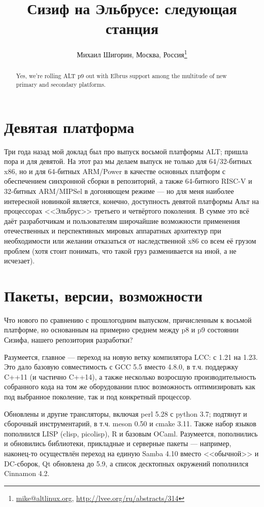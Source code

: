 \documentclass[10pt, a5paper]{article}
\begin{document}
\title{Сизиф на Эльбрусе: следующая станция}
\author{Михаил Шигорин, Москва, Россия\footnote{\url{mike@altlinux.org}, \url{http://lvee.org/ru/abstracts/314}}}
\maketitle
\begin{abstract}
Yes, we're rolling ALT p9 out with Elbrus support among the multitude of new primary and secondary platforms.
\end{abstract}
\section*{Девятая платформа}

Три года назад мой доклад был про выпуск восьмой платформы ALT; пришла пора и для девятой.  На этот раз мы делаем выпуск не только для 64/32-битных x86, но и для 64-битных ARM/Power в качестве основных платформ с обеспечением синхронной сборки в репозиторий, а также 64-битного RISC-V и 32-битных ARM/MIPSel в догоняющем режиме --- но для меня наиболее интересной новинкой является, конечно, доступность девятой платформы Альт на процессорах <<Эльбрус>> третьего и четвёртого поколения.
В сумме это всё даёт разработчикам и пользователям широчайшие возможности применения отечественных и перспективных мировых аппаратных архитектур при необходимости или желании отказаться от наследственной x86 со всем её грузом проблем (хотя стоит понимать, что такой груз разменивается на иной, а не исчезает).

\section*{Пакеты, версии, возможности}

Что нового по сравнению с прошлогодним выпуском, причисленным к восьмой платформе, но основанным на примерно среднем между p8 и p9 состоянии Сизифа, нашего репозитория разработки?

Разумеется, главное --- переход на новую ветку компилятора LCC: с 1.21 на 1.23.  Это дало базовую совместимость с GCC 5.5 вместо 4.8.0, в т.ч. поддержку C++11 (и частично C++14), а также несколько возросшую производительность собранного кода на том же оборудовании плюс возможность оптимизировать как под выбранное поколение, так и под конкретный процессор.

Обновлены и другие трансляторы, включая perl 5.28 с python 3.7; подтянут и сборочный инструментарий, в т.ч. meson 0.50 и cmake 3.11.  Также набор языков пополнился LISP (clisp, picolisp), R и базовым OCaml.  Разумеется, пополнились и обновились библиотеки, прикладные и серверные пакеты --- например, наконец-то осуществлён переход на единую Samba 4.10 вместо <<обычной>> и DC-сборок, Qt обновлена до 5.9, а список десктопных окружений пополнился Cinnamon 4.2.
\end{document}
